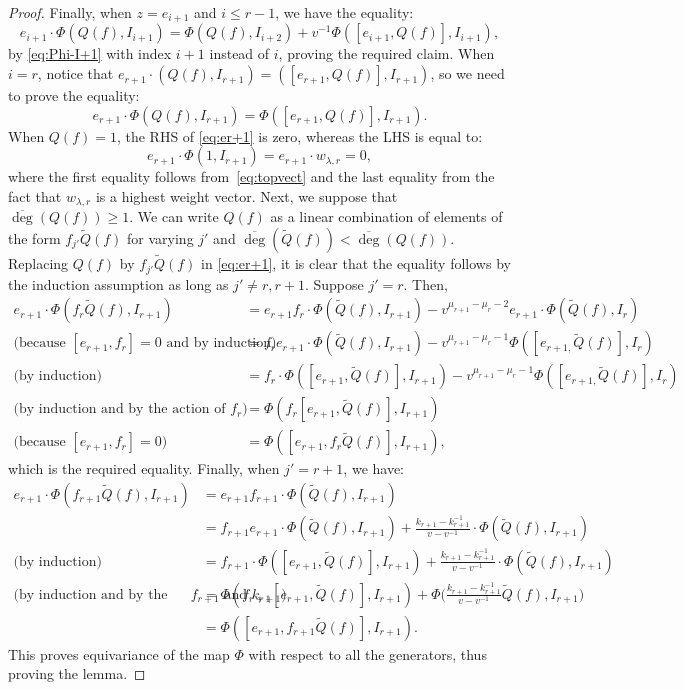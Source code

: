 \documentclass{amsart}
\numberwithin{equation}{section}
\theoremstyle{theorem}
\theoremstyle{definition}
\newcommand{\ol}{\overline}
\begin{document}
\begin{proof}
Finally, when $z=e_{i+1}$ and $i\leq r-1$, we have the equality:
\[e_{i+1}\cdot\Phi( Q(f),I_{i+1}) = \Phi(Q(f),I_{i+2})+v^{-1}\Phi([e_{i+1},Q(f)], I_{i+1}),\]
by \eqref{eq:Phi-I+1} with index $i+1$ instead of $i$, proving the required claim. When $i=r$, notice that $e_{r+1}\cdot (Q(f), I_{r+1}) = ([e_{r+1},Q(f)], I_{r+1})$, so we need to prove the equality:
\begin{equation}\label{eq:er+1}e_{r+1}\cdot \Phi(Q(f), I_{r+1}) = \Phi([e_{r+1},Q(f)], I_{r+1}).\end{equation}
When $Q(f)=1$, the RHS of \eqref{eq:er+1} is zero, whereas the LHS is equal to:
\[e_{r+1}\cdot \Phi(1, I_{r+1})= e_{r+1}\cdot w_{\lambda,r}=0,\]
where the first equality follows from~\eqref{eq:topvect} and the last equality from the fact that $w_{\lambda,r}$ is a highest weight vector. %
Next, we suppose that $\ol\deg(Q(f))\geq 1$. We can write $Q(f)$ as a linear combination of elements of the form $f_{j'}\widetilde Q(f)$ for varying $j'$ and $\ol\deg(\widetilde Q(f))< \ol\deg(Q(f))$. Replacing $Q(f)$ by $f_{j'}\widetilde Q(f)$ in \eqref{eq:er+1}, it is clear that the equality follows by the induction assumption as long as $j'\neq r,r+1$. Suppose $j'=r$. Then,
\begin{align*}
e_{r+1}\cdot \Phi(f_{r}\widetilde Q(f), I_{r+1})&=e_{r+1}f_{r}\cdot \Phi(\widetilde Q(f), I_{r+1}) - v^{\mu_{r+1}-\mu_r-2}e_{r+1}\cdot\Phi(\widetilde{Q}(f),I_r)\\
\text{(because $[e_{r+1},f_r]=0$ and by induction) }&=f_{r}e_{r+1}\cdot \Phi(\widetilde Q(f), I_{r+1}) - v^{\mu_{r+1}-\mu_r-1}\Phi([e_{r+1,}\widetilde{Q}(f)],I_r)\\
\text{(by induction) }&=f_{r}\cdot \Phi([e_{r+1},\widetilde Q(f)], I_{r+1}) - v^{\mu_{r+1}-\mu_r-1}\Phi([e_{r+1,}\widetilde{Q}(f)],I_r)\\
\text{(by induction and by the action of $f_r$) }&=\Phi(f_r[e_{r+1},\widetilde Q(f)], I_{r+1})\\
\text{(because $[e_{r+1},f_r]=0$) }&=\Phi([e_{r+1},f_r\widetilde Q(f)], I_{r+1}),
\end{align*}
which is the required equality. Finally, when $j'=r+1$, we have:
\begin{align*}
e_{r+1}\cdot \Phi(f_{r+1}\widetilde Q(f), I_{r+1})&=e_{r+1}f_{r+1}\cdot \Phi(\widetilde Q(f), I_{r+1})\\
&=f_{r+1}e_{r+1}\cdot \Phi(\widetilde Q(f), I_{r+1}) + \frac{k_{r+1}-k_{r+1}^{-1}}{v-v^{-1}}\cdot \Phi(\widetilde Q(f), I_{r+1})\\
\text{(by induction) }&=f_{r+1}\cdot \Phi([e_{r+1},\widetilde Q(f)], I_{r+1}) + \frac{k_{r+1}-k_{r+1}^{-1}}{v-v^{-1}}\cdot \Phi(\widetilde Q(f), I_{r+1})\\
\text{(by induction and by the actions of $f_{r+1}$ and $k_{r+1}$) }&=\Phi(f_{r+1}[e_{r+1},\widetilde Q(f)], I_{r+1}) + \Phi\Big(\frac{k_{r+1}-k_{r+1}^{-1}}{v-v^{-1}}\widetilde Q(f), I_{r+1}\Big)\\
&=\Phi([e_{r+1},f_{r+1}\widetilde Q(f)], I_{r+1}).
\end{align*}
This proves equivariance of the map $\Phi$ with respect to all the generators, thus proving the lemma.
\end{proof}
\end{document}
